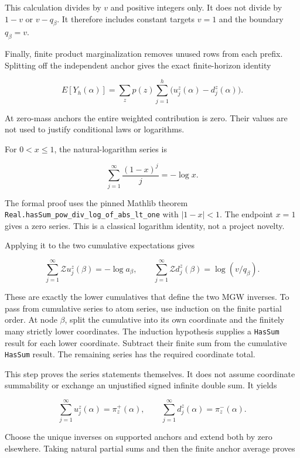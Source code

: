 This calculation divides by \(v\) and positive integers only. It does not divide by \(1-v\) or \(v-q_\beta\). It therefore includes constant targets \(v=1\) and the boundary \(q_\beta=v\).

Finally, finite product marginalization removes unused rows from each prefix. Splitting off the independent anchor gives the exact finite-horizon identity

\[
E[Y_h(\alpha)]
=\sum_zp(z)\sum_{j=1}^h\bigl(u_j^z(\alpha)-d_j^z(\alpha)\bigr).
\]

At zero-mass anchors the entire weighted contribution is zero. Their values are not used to justify conditional laws or logarithms.

\label{why-the-mean-converges-to-the-named-atom}

For \(0<x\le1\), the natural-logarithm series is

\[
\sum_{j=1}^{\infty}\frac{(1-x)^j}{j}=-\log x.
\]

The formal proof uses the pinned Mathlib theorem \texttt{Real.hasSum\_pow\_div\_log\_of\_abs\_lt\_one} with \(|1-x|<1\). The endpoint \(x=1\) gives a zero series. This is a classical logarithm identity, not a project novelty.

Applying it to the two cumulative expectations gives

\[
\sum_{j=1}^{\infty}\mathcal Zu_j^z(\beta)=-\log a_\beta,
\qquad
\sum_{j=1}^{\infty}\mathcal Zd_j^z(\beta)=\log(v/q_\beta).
\]

These are exactly the lower cumulatives that define the two MGW inverses. To pass from cumulative series to atom series, use induction on the finite partial order. At node \(\beta\), split the cumulative into its own coordinate and the finitely many strictly lower coordinates. The induction hypothesis supplies a \texttt{HasSum} result for each lower coordinate. Subtract their finite sum from the cumulative \texttt{HasSum} result. The remaining series has the required coordinate total.

This step proves the series statements themselves. It does not assume coordinate summability or exchange an unjustified signed infinite double sum. It yields

\[
\sum_{j=1}^{\infty}u_j^z(\alpha)=\pi_z^+(\alpha),
\qquad
\sum_{j=1}^{\infty}d_j^z(\alpha)=\pi_z^-(\alpha).
\]

Choose the unique inverses on supported anchors and extend both by zero elsewhere. Taking natural partial sums and then the finite anchor average proves


